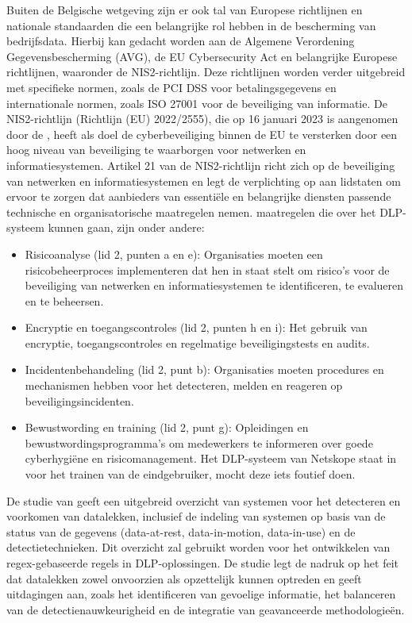 Buiten de Belgische wetgeving zijn er ook tal van Europese richtlijnen en nationale standaarden die een belangrijke rol hebben in de bescherming van bedrijfsdata. Hierbij kan gedacht worden aan de Algemene Verordening Gegevensbescherming (AVG), de EU Cybersecurity Act en belangrijke Europese richtlijnen, waaronder de NIS2-richtlijn. Deze richtlijnen worden verder uitgebreid met specifieke normen, zoals de PCI DSS voor betalingsgegevens en internationale normen, zoals ISO 27001 voor de beveiliging van informatie. 
De NIS2-richtlijn (Richtlijn (EU) 2022/2555), die op 16 januari 2023 is aangenomen door de \cite{nis2directive}, heeft als doel de cyberbeveiliging binnen de EU te versterken door een hoog niveau van beveiliging te waarborgen voor netwerken en informatiesystemen. Artikel 21 van de NIS2-richtlijn richt zich op de beveiliging van netwerken en informatiesystemen en legt de verplichting op aan lidstaten om ervoor te zorgen dat aanbieders van essentiële en belangrijke diensten passende technische en organisatorische maatregelen nemen. maatregelen die over het DLP-systeem kunnen gaan, zijn onder andere: 

\begin{itemize}
    \item Risicoanalyse (lid 2, punten a en e): Organisaties moeten een risicobeheerproces implementeren dat hen in staat stelt om risico's voor de beveiliging van netwerken en informatiesystemen te identificeren, te evalueren en te beheersen.
    \item Encryptie en toegangscontroles (lid 2, punten h en i): Het gebruik van encryptie, toegangscontroles en regelmatige beveiligingstests en audits.
    \item Incidentenbehandeling (lid 2, punt b): Organisaties moeten procedures en mechanismen hebben voor het detecteren, melden en reageren op beveiligingsincidenten.
    \item Bewustwording en training (lid 2, punt g): Opleidingen en bewustwordingsprogramma's om medewerkers te informeren over goede cyberhygiëne en risicomanagement. \autocite{nis2directive} Het DLP-systeem van Netskope staat in voor het trainen van de eindgebruiker, mocht deze iets foutief doen.
\end{itemize}

De studie van \textcite{Nayak2020} geeft een uitgebreid overzicht van systemen voor het detecteren en voorkomen van datalekken, inclusief de indeling van systemen op basis van de status van de gegevens (data-at-rest, data-in-motion, data-in-use) en de detectietechnieken. Dit overzicht zal gebruikt worden voor het ontwikkelen van regex-gebaseerde regels in DLP-oplossingen. De studie legt de nadruk op het feit dat datalekken zowel onvoorzien als opzettelijk kunnen optreden en geeft uitdagingen aan, zoals het identificeren van gevoelige informatie, het balanceren van de detectienauwkeurigheid en de integratie van geavanceerde methodologieën.

